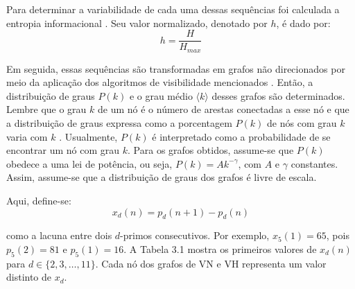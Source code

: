 \documentclass[12pt,a4paper,fleqn]{report}
\begin{document}
Para determinar a variabilidade de cada uma dessas sequências foi calculada a entropia
informacional \cite{a301}. 
Seu valor normalizado, denotado por $h$, é dado por:
\begin{equation}
\label{entropy}
h = \frac{H}{H_{max}}
\end{equation}

Em seguida, essas sequências são transformadas
em grafos não direcionados por meio da aplicação dos algoritmos de
visibilidade mencionados \cite{a14,a13}. Então, a distribuição de graus $P(k)$ 
e o grau médio $\langle k \rangle$ desses grafos 
são determinados. Lembre que o grau $k$ de um
nó é o número de arestas conectadas a esse nó \cite{b02,msdc} e
que a distribuição de graus expressa como a porcentagem $P(k)$ de
nós com grau $k$ varia com $k$ \cite{b02,msdc}. Usualmente,
$P(k)$ é interpretado como a probabilidade de se encontrar um nó
com grau $k$. Para os grafos obtidos, assume-se que $P(k)$ obedece a uma lei de potência, ou seja, $P(k)=A k^{-\gamma}$, com $A$ e $\gamma$ constantes. Assim, assume-se que a distribuição de graus dos grafos é livre de escala.

Aqui, define-se:
\begin{equation}x_d(n)=p_d(n+1)-p_d(n) 
\end{equation}

\noindent
como a lacuna entre dois $d$-primos
consecutivos. Por exemplo, $x_5(1)=65$, pois
$p_5(2)=81$ e $p_5(1)=16$. A Tabela 3.1
mostra os primeiros valores de $x_d(n)$ para $d \in \{2, 3, \ldots, 11\}$. Cada nó dos grafos de VN e VH representa um valor distinto de $x_d$. 
\end{document}
